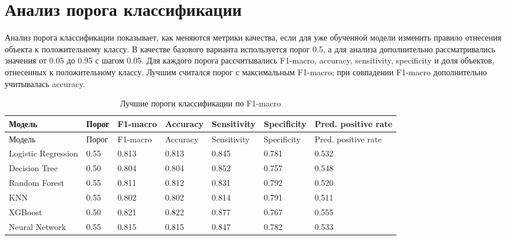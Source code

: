 \documentclass[14pt,a4paper]{extreport}
\begin{document}
\section{Анализ порога классификации}

Анализ порога классификации показывает, как меняются метрики качества, если для уже обученной модели изменить правило отнесения объекта к положительному классу. В качестве базового варианта используется порог 0.5, а для анализа дополнительно рассматривались значения от 0.05 до 0.95 с шагом 0.05. Для каждого порога рассчитывались F1-macro, accuracy, sensitivity, specificity и доля объектов, отнесенных к положительному классу. Лучшим считался порог с максимальным F1-macro; при совпадении F1-macro дополнительно учитывалась accuracy.

\scriptsize
\begin{longtable}{lllllll}
\caption{Лучшие пороги классификации по F1-macro}\label{tab:thresholds}\\
\toprule
Модель & Порог & F1-macro & Accuracy & Sensitivity & Specificity & Pred. positive rate \\
\midrule
\endfirsthead
\toprule
Модель & Порог & F1-macro & Accuracy & Sensitivity & Specificity & Pred. positive rate \\
\midrule
\endhead
Logistic Regression & 0.55 & 0.813 & 0.813 & 0.845 & 0.781 & 0.532 \\
Decision Tree & 0.50 & 0.804 & 0.804 & 0.852 & 0.757 & 0.548 \\
Random Forest & 0.55 & 0.811 & 0.812 & 0.831 & 0.792 & 0.520 \\
KNN & 0.55 & 0.802 & 0.802 & 0.814 & 0.791 & 0.511 \\
XGBoost & 0.50 & 0.821 & 0.822 & 0.877 & 0.767 & 0.555 \\
Neural Network & 0.55 & 0.815 & 0.815 & 0.847 & 0.782 & 0.533 \\
\bottomrule
\end{longtable}
\normalsize
\end{document}
